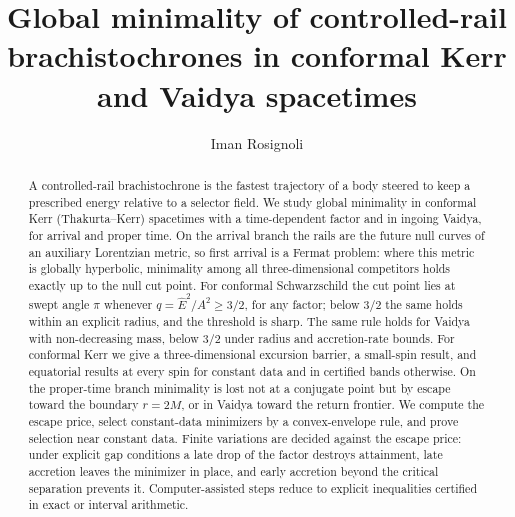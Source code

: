 \documentclass[aip,jmp,amsmath,amssymb,reprint]{revtex4-2}
\newcommand{\Ehat}{\hat E}
\theoremstyle{plain}
\theoremstyle{definition}
\begin{document}
\title{Global minimality of controlled-rail brachistochrones in conformal Kerr and Vaidya spacetimes}
\author{Iman Rosignoli}

\begin{abstract}
A controlled-rail brachistochrone is the fastest trajectory of a body steered to keep a prescribed energy
relative to a selector field. We study global minimality in conformal Kerr (Thakurta--Kerr) spacetimes
with a time-dependent factor and in ingoing Vaidya, for arrival and proper time. On the arrival branch
the rails are the future null curves of an auxiliary Lorentzian metric, so first arrival is a Fermat
problem: where this metric is globally hyperbolic, minimality among all three-dimensional competitors holds
exactly up to the null cut point. For conformal Schwarzschild the cut point lies at swept angle $\pi$
whenever $q=\Ehat^2/A^2\ge3/2$, for any factor; below $3/2$ the same holds within an explicit
radius, and the threshold is sharp. The same rule holds for Vaidya with non-decreasing mass, below $3/2$
under radius and accretion-rate bounds. For conformal Kerr we give a three-dimensional excursion barrier, a
small-spin result, and equatorial results at every spin for constant data and in certified bands
otherwise. On the proper-time branch minimality is lost not at a conjugate point but by escape toward the
boundary $r=2M$, or in Vaidya toward the return frontier. We compute the escape price, select constant-data
minimizers by a convex-envelope rule, and prove selection near constant data. Finite variations are
decided against the escape price: under explicit gap conditions a late drop of the factor destroys
attainment, late accretion leaves the minimizer in place, and early accretion beyond the critical
separation prevents it. Computer-assisted steps reduce to explicit inequalities certified in exact or
interval arithmetic.
\end{abstract}
\maketitle

\end{document}
